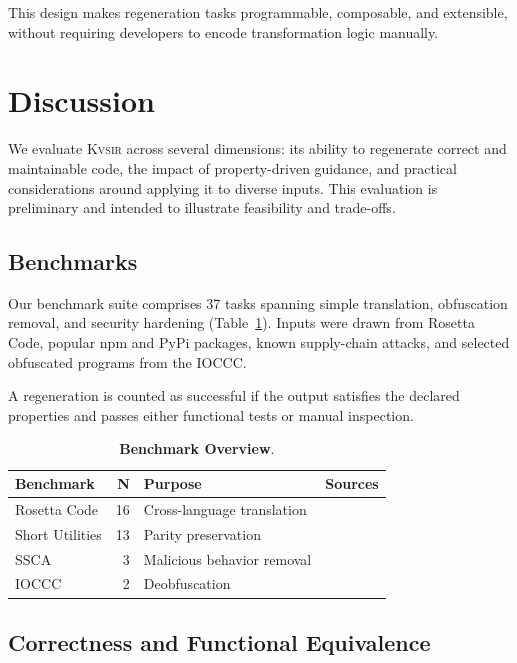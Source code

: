 \documentclass[sigplan,review,anonymous,10pt]{acmart}
\newcommand{\sys}{{\scshape Kv{\textalpha}sir}\xspace}
\begin{document}
This design makes regeneration tasks programmable, composable, and extensible, without requiring developers to encode transformation logic manually.

\section{Discussion}
\label{sec:evaluation}

We evaluate \sys across several dimensions: its ability to regenerate correct and maintainable code, the impact of property-driven guidance, and practical considerations around applying it to diverse inputs. This evaluation is preliminary and intended to illustrate feasibility and trade-offs.

\subsection{Benchmarks}

Our benchmark suite comprises 37 tasks spanning simple translation, obfuscation removal, and security hardening (Table~\ref{tab:benchmarks}). Inputs were drawn from Rosetta Code, popular npm and PyPi packages, known supply-chain attacks, and selected obfuscated programs from the IOCCC.

A regeneration is counted as successful if the output satisfies the declared properties and passes either functional tests or manual inspection.

\begin{table}[ht]
\centering
\caption{\textbf{Benchmark Overview}.}
\begin{tabular}{lrll}
\toprule
Benchmark & N & Purpose & Sources \\
\midrule
Rosetta Code & 16 & Cross-language translation & \cite{rosettacode} \\
Short Utilities & 13 & Parity preservation & \cite{regbench2025} \\
SSCA & 3 & Malicious behavior removal & \cite{ohm2020backstabber,ev:eurosec:2022} \\
IOCCC & 2 & Deobfuscation & \cite{ioccc} \\
\bottomrule
\end{tabular}
\label{tab:benchmarks}
\end{table}

\subsection{Correctness and Functional Equivalence}
\end{document}
